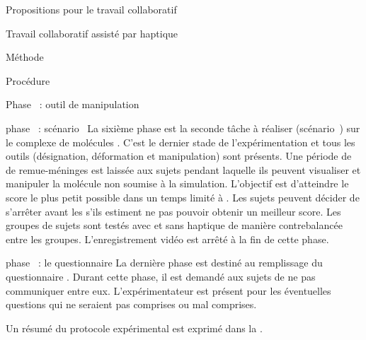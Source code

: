 \documentclass[myfrancais]{mythesis}
\begin{document}
\begin{mypart}{Propositions pour le travail collaboratif}
\begin{mychapter}{Travail collaboratif assisté par haptique}
\begin{mysection}{Méthode}
\begin{mysubsection}{Procédure}
\begin{myparagraph}{Phase~ : outil de manipulation}
					\end{myparagraph}
					\begin{myparagraph}{phase~ : scénario~}
						La sixième phase est la seconde tâche à réaliser (scénario~) sur le complexe de molécules \myNusENusG.
						C'est le dernier stade de l'expérimentation et tous les outils (désignation, déformation et manipulation) sont présents.
						Une période de  de remue-méninges est laissée aux sujets pendant laquelle ils peuvent visualiser et manipuler la molécule non soumise à la simulation.
						L'objectif est d'atteindre le score  le plus petit possible dans un temps limité à .
						Les sujets peuvent décider de s'arrêter avant les  s'ils estiment ne pas pouvoir obtenir un meilleur score.
						Les groupes de sujets sont testés avec et sans haptique de manière contrebalancée entre les groupes.
						L'enregistrement vidéo est arrêté à la fin de cette phase.
					\end{myparagraph}
					\begin{myparagraph}{phase~ : le questionnaire}
						La dernière phase est destiné au remplissage du questionnaire .
						Durant cette phase, il est demandé aux sujets de ne pas communiquer entre eux.
						L'expérimentateur est présent pour les éventuelles questions qui ne seraient pas comprises ou mal comprises.
					\end{myparagraph}

					Un résumé du protocole expérimental est exprimé dans la .


\end{mysubsection}
\end{mysection}
\end{mychapter}
\end{mypart}
\end{document}
